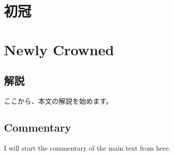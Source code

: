 \ifJA

\section{初冠}
\label{dan:001}
\else
\section{Newly Crowned}
\label{dan:001}
\fi



\ifJA
  \subsection*{解説}
 ここから、本文の解説を始めます。
\else
 \subsection*{Commentary}
 I will start the commentary of the main text from here.
\fi

